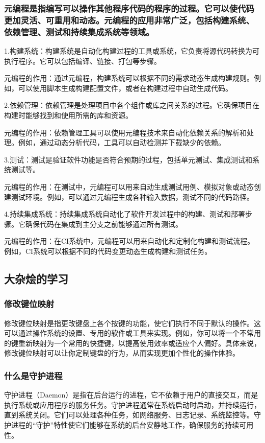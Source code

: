 \documentclass[UTF8,a4paper]{ctexart}
\begin{document}
\begin{sloppypar}
	\subsubsection{元编程是指编写可以操作其他程序代码的程序的过程。它可以使代码更加灵活、可重用和动态。元编程的应用非常广泛，包括构建系统、依赖管理、测试和持续集成系统等领域。}
	1.构建系统：构建系统是自动化构建过程的工具或系统，它负责将源代码转换为可执行程序。它可以包括编译、链接、打包等步骤。
	
	元编程的作用：通过元编程，构建系统可以根据不同的需求动态生成构建规则。例如，可以使用脚本生成构建配置文件，或者在构建过程中自动生成代码。
	
	2.依赖管理：依赖管理是处理项目中各个组件或库之间关系的过程。它确保项目在构建时能够找到和使用所需的库和资源。
	
	元编程的作用：依赖管理工具可以使用元编程技术来自动化依赖关系的解析和处理。例如，通过动态分析代码，工具可以自动检测并下载缺少的依赖。
	
	3.测试：测试是验证软件功能是否符合预期的过程，包括单元测试、集成测试和系统测试等。
	
	元编程的作用：在测试中，元编程可以用来自动生成测试用例、模拟对象或动态创建测试环境。例如，可以通过元编程生成各种输入数据，测试不同的代码路径。
	
	4.持续集成系统：持续集成系统自动化了软件开发过程中的构建、测试和部署步骤。它确保代码在集成到主分支之前能够通过所有测试。
	
	元编程的作用：在CI系统中，元编程可以用来自动化和定制化构建和测试流程。例如，CI系统可以根据不同的代码变更动态生成构建和测试任务。
	\subsection{大杂烩的学习}
	\subsubsection{修改键位映射}
	修改键位映射是指更改键盘上各个按键的功能，使它们执行不同于默认的操作。这可以通过操作系统的设置、专用的软件或工具来实现。例如，你可以将一个不常用的键重新映射为一个常用的快捷键，以提高使用效率或适应个人偏好。具体来说，修改键位映射可以让你定制键盘的行为，从而实现更加个性化的操作体验。
	\subsubsection{什么是守护进程}
	守护进程（Daemon）是指在后台运行的进程，它不依赖于用户的直接交互，而是执行系统或应用程序的服务任务。守护进程通常在系统启动时启动，并持续运行，直到系统关闭。它们可以处理各种任务，如网络服务、日志记录、系统监控等。守护进程的“守护”特性使它们能够在系统的后台安静地工作，确保服务的持续可用性。

\end{sloppypar}
\end{document}
